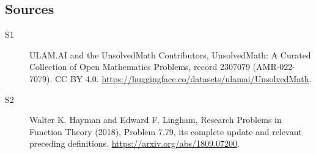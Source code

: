 \documentclass[11pt]{article}
\begin{document}
\subsection{Sources}
\begin{description}
\item[\hypertarget{source:2307079:1}{S1}] ULAM.AI and the UnsolvedMath Contributors, UnsolvedMath: A Curated Collection of Open Mathematics Problems, record 2307079 (AMR-022-7079). CC BY 4.0. \url{https://huggingface.co/datasets/ulamai/UnsolvedMath}.
\item[\hypertarget{source:2307079:2}{S2}] Walter K. Hayman and Edward F. Lingham, Research Problems in Function Theory (2018), Problem 7.79, its complete update and relevant preceding definitions. \url{https://arxiv.org/abs/1809.07200}.
\end{description}
\label{end:2307079}
\end{document}
